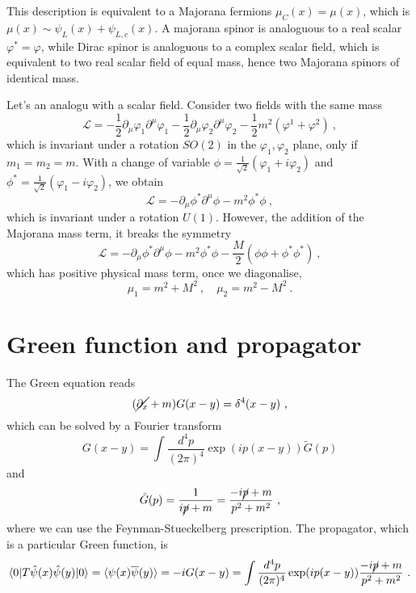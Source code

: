    This description is equivalent to a Majorana fermions $\mu_C(x) = \mu (x)$, which is $\mu (x) \sim \psi_L(x) + \psi_{L,c} (x)$. A majorana spinor is analoguous to a real scalar $\varphi^* = \varphi$, while Dirac spinor is analoguous to a complex scalar field, which is equivalent to two real scalar field of equal mass, hence two Majorana spinors of identical mass.  

    Let's an analogu with a scalar field. Consider two fields with the same mass 
    \begin{equation*}
        \mathcal L = - \frac{1}{2} \partial_\mu \varphi_1 \partial^\mu \varphi_1 - \frac{1}{2} \partial_\mu \varphi_2 \partial^\mu \varphi_2 - \frac{1}{2} m^2 (\varphi^1 + \varphi^2) ~,
    \end{equation*}
    which is invariant under a rotation $SO(2)$ in the $\varphi_1, \varphi_2$ plane, only if $m_1 = m_2 = m$. With a change of variable $\phi = \frac{1}{\sqrt{2}} (\varphi_1 + i \varphi_2)$ and $\phi^* = \frac{1}{\sqrt{2}} (\varphi_1 - i \varphi_2)$, we obtain 
    \begin{equation*}
        \mathcal L = - \partial_\mu \phi^* \partial^\mu \phi - m^2 \phi^* \phi ~,
    \end{equation*}
    which is invariant under a rotation $U(1)$. However, the addition of the Majorana mass term, it breaks the symmetry 
    \begin{equation*}
        \mathcal L = - \partial_\mu \phi^* \partial^\mu \phi - m^2 \phi^* \phi - \frac{M}{2} (\phi \phi + \phi^* \phi^* )~,
    \end{equation*}
    which has positive physical mass term, once we diagonalise,
    \begin{equation*}
        \mu_1 = m^2 + M^2 ~, \quad \mu_2 = m^2 - M^2 ~.
    \end{equation*}

\section{Green function and propagator}

    The Green equation reads 
    \begin{equation*}
        (\cancel{\partial_x} + m) G(x - y) = \delta^4 (x - y) ~,
    \end{equation*}
    which can be solved by a Fourier transform 
    \begin{equation*}
        G(x-y) = \int \frac{d^4 p}{(2\pi)^4} \exp(ip(x-y)) \tilde G(p) 
    \end{equation*}
    and 
    \begin{equation*}
        \tilde G(p) = \frac{1}{i \cancel{p} + m} = \frac{- i \cancel{p} + m}{p^2 + m^2} ~,
    \end{equation*}
    where we can use the Feynman-Stueckelberg prescription. The propagator, which is a particular Green function, is 
    \begin{equation*}
        \langle0\vert T \hat \psi(x) \hat \psi (y) \vert0\rangle = \langle\psi(x) \overline \psi (y)\rangle = - i G(x - y) = \int \frac{d^4 p}{(2\pi)^4} \exp(i p (x-y)) \frac{- i \cancel{p} + m}{p^2 + m^2} ~.
    \end{equation*}
    